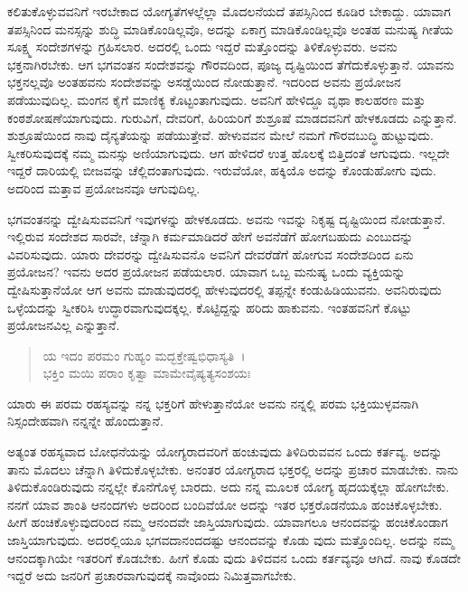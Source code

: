 ಕಲಿತುಕೊಳ್ಳುವವನಿಗೆ ಇರಬೇಕಾದ ಯೋಗ್ಯತೆಗಳಲ್ಲೆಲ್ಲಾ ಮೊದಲನೆಯದೆ ತಪಸ್ಸಿನಿಂದ ಕೂಡಿರ ಬೇಕಾದ್ದು. ಯಾವಾಗ ತಪಸ್ಸಿನಿಂದ ಮನಸ್ಸನ್ನು ಶುದ್ಧಿ ಮಾಡಿಕೊಂಡಿಲ್ಲವೊ, ಅದನ್ನು ಏಕಾಗ್ರ ಮಾಡಿಕೊಂಡಿಲ್ಲವೊ ಅಂತಹ ಮನುಷ್ಯ ಗೀತೆಯ ಸೂಕ್ಷ್ಮ ಸಂದೇಶಗಳನ್ನು ಗ್ರಹಿಸಲಾರ. ಅದರಲ್ಲಿ ಒಂದು ಇದ್ದರೆ ಮತ್ತೊಂದನ್ನು ತಿಳಿಕೊಳ್ಳುವರು. ಅವನು ಭಕ್ತನಾಗಿರಬೇಕು. ಆಗ ಭಗವಂತನ ಸಂದೇಶವನ್ನು ಗೌರವದಿಂದ, ಪೂಜ್ಯ ದೃಷ್ಟಿಯಿಂದ ತೆಗೆದುಕೊಳ್ಳುತ್ತಾನೆ. ಯಾವನು ಭಕ್ತನಲ್ಲವೊ ಅಂತಹವನು ಸಂದೇಶವನ್ನು ಅಸಡ್ಡೆಯಿಂದ ನೋಡುತ್ತಾನೆ. ಇದರಿಂದ ಅವನು ಪ್ರಯೋಜನ ಪಡೆಯುವುದಿಲ್ಲ. ಮಂಗನ ಕೈಗೆ ಮಾಣಿಕ್ಯ ಕೊಟ್ಟಂತಾಗುವುದು. ಅವನಿಗೆ ಹೇಳಿದ್ದೂ ವೃಥಾ ಕಾಲಹರಣ ಮತ್ತು ಕಂಠಶೋಷಣೆಯಾಗುವುದು. ಗುರುವಿಗೆ, ದೇವರಿಗೆ, ಹಿರಿಯರಿಗೆ ಶುಶ್ರೂಷೆ ಮಾಡದವನಿಗೆ ಹೇಳಕೂಡದು ಎನ್ನುತ್ತಾನೆ. ಶುಶ್ರೂಷೆಯಿಂದ ನಾವು ದೈನ್ಯತೆಯನ್ನು ಪಡೆಯುತ್ತೇವೆ. ಹೇಳುವವನ ಮೇಲೆ ನಮಗೆ ಗೌರವಬುದ್ಧಿ ಹುಟ್ಟುವುದು. ಸ್ವೀಕರಿಸುವುದಕ್ಕೆ ನಮ್ಮ ಮನಸ್ಸು ಅಣಿಯಾಗುವುದು. ಆಗ ಹೇಳಿದರೆ ಉತ್ತ ಹೊಲಕ್ಕೆ ಬಿತ್ತಿದಂತೆ ಆಗುವುದು. ಇಲ್ಲದೇ ಇದ್ದರೆ ದಾರಿಯಲ್ಲಿ ಬೀಜವನ್ನು ಚೆಲ್ಲಿದಂತಾಗುವುದು. ಇರುವೆಯೋ, ಹಕ್ಕಿಯೊ ಅದನ್ನು ಕೊಂಡುಹೋಗು ವುದು. ಅದರಿಂದ ಮತ್ತಾವ ಪ್ರಯೋಜನವೂ ಆಗುವುದಿಲ್ಲ.

ಭಗವಂತನನ್ನು ದ್ವೇಷಿಸುವವನಿಗೆ ಇವುಗಳನ್ನು ಹೇಳಕೂಡದು. ಅವನು ಇವನ್ನು ನಿಕೃಷ್ಟ ದೃಷ್ಟಿಯಿಂದ ನೋಡುತ್ತಾನೆ. ಇಲ್ಲಿರುವ ಸಂದೇಶದ ಸಾರವೇ, ಚೆನ್ನಾಗಿ ಕರ್ಮಮಾಡಿದರೆ ಹೇಗೆ ಅವನೆಡೆಗೆ ಹೋಗಬಹುದು ಎಂಬುದನ್ನು ವಿವರಿಸುವುದು. ಯಾರು ದೇವರನ್ನು ದ್ವೇಷಿಸುವನೊ ಅವನಿಗೆ ದೇವರೆಡೆಗೆ ಹೋಗುವ ಸಂದೇಶದಿಂದ ಏನು ಪ್ರಯೋಜನ? ಇವನು ಅದರ ಪ್ರಯೋಜನ ಪಡೆಯಲಾರ. ಯಾವಾಗ ಒಬ್ಬ ಮನುಷ್ಯ ಒಂದು ವ್ಯಕ್ತಿಯನ್ನು ದ್ವೇಷಿಸುತ್ತಾನೆಯೋ ಆಗ ಅವನು ಮಾಡುವುದರಲ್ಲಿ ಹೇಳುವುದರಲ್ಲಿ ತಪ್ಪನ್ನೇ ಕಂಡುಹಿಡಿಯುವನು. ಅವನಿರುವುದು ಒಳ್ಳೆಯದನ್ನು ಸ್ವೀಕರಿಸಿ ಉದ್ಧಾರವಾಗುವುದಕ್ಕಲ್ಲ. ಕೊಟ್ಟಿದ್ದನ್ನು ಹರಿದು ಹಾಕುವನು. ಇಂತಹವನಿಗೆ ಕೊಟ್ಟು ಪ್ರಯೋಜನವಿಲ್ಲ ಎನ್ನುತ್ತಾನೆ.

\begin{verse}
ಯ ಇದಂ ಪರಮಂ ಗುಹ್ಯಂ ಮದ್ಭಕ್ತೇಷ್ವಭಿಧಾಸ್ಯತಿ~।\\ಭಕ್ತಿಂ ಮಯಿ ಪರಾಂ ಕೃತ್ವಾ ಮಾಮೇವೈಷ್ಯತ್ಯಸಂಶಯಃ 
\end{verse}

{\small ಯಾರು ಈ ಪರಮ ರಹಸ್ಯವನ್ನು ನನ್ನ ಭಕ್ತರಿಗೆ ಹೇಳುತ್ತಾನೆಯೋ ಅವನು ನನ್ನಲ್ಲಿ ಪರಮ ಭಕ್ತಿಯುಳ್ಳವನಾಗಿ ನಿಸ್ಸಂದೇಹವಾಗಿ ನನ್ನನ್ನೇ ಹೊಂದುತ್ತಾನೆ.}

ಅತ್ಯಂತ ರಹಸ್ಯವಾದ ಬೋಧನೆಯನ್ನು ಯೋಗ್ಯರಾದವರಿಗೆ ಹಂಚುವುದು ತಿಳಿದಿರುವವನ ಒಂದು ಕರ್ತವ್ಯ. ಅದನ್ನು ತಾನು ಮೊದಲು ಚೆನ್ನಾಗಿ ತಿಳಿದುಕೊಳ್ಳಬೇಕು. ಅನಂತರ ಯೋಗ್ಯರಾದ ಭಕ್ತರಲ್ಲಿ ಅದನ್ನು ಪ್ರಚಾರ ಮಾಡಬೇಕು. ನಾನು ತಿಳಿದುಕೊಂಡಿರುವುದು ನನ್ನಲ್ಲೇ ಕೊನೆಗೊಳ್ಳ ಬಾರದು. ಅದು ನನ್ನ ಮೂಲಕ ಯೋಗ್ಯ ಹೃದಯಕ್ಕೆಲ್ಲಾ ಹೋಗಬೇಕು. ನನಗೆ ಯಾವ ಶಾಂತಿ ಆನಂದಗಳು ಅದರಿಂದ ಬಂದಿವೆಯೋ ಅದನ್ನು ಇತರ ಭಕ್ತರೊಡನೆಯೂ ಹಂಚಿಕೊಳ್ಳಬೇಕು. ಹೀಗೆ ಹಂಚಿಕೊಳ್ಳುವುದರಿಂದ ನಮ್ಮ ಆನಂದವೇ ಜಾಸ್ತಿಯಾಗುವುದು. ಯಾವಾಗಲೂ ಆನಂದವನ್ನು ಹಂಚಿಕೊಂಡಾಗ ಜಾಸ್ತಿಯಾಗುವುದು. ಅದರಲ್ಲಿಯೂ ಭಗವದಾನಂದದಷ್ಟು ಆನಂದವನ್ನು ಕೊಡು ವುದು ಮತ್ತೊಂದಿಲ್ಲ. ಅದನ್ನು ನಮ್ಮ ಆನಂದಕ್ಕಾಗಿಯೇ ಇತರರಿಗೆ ಕೊಡಬೇಕು. ಹೀಗೆ ಕೊಡು ವುದು ತಿಳಿದವನ ಒಂದು ಕರ್ತವ್ಯವೂ ಆಗಿದೆ. ನಾವು ಕೊಡದೇ ಇದ್ದರೆ ಅದು ಜನರಿಗೆ ಪ್ರಚಾರವಾಗುವುದಕ್ಕೆ ನಾವೊಂದು ನಿಮಿತ್ತವಾಗಬೇಕು.

